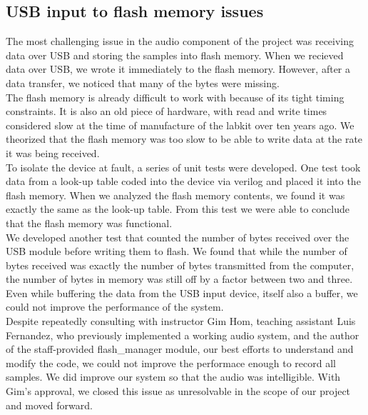 \documentclass{article}
\begin{document}
\subsection{USB input to flash memory issues}
The most challenging issue in the audio component of the project was receiving data over USB and storing the samples into flash memory. When we recieved data over USB, we wrote it immediately to the flash memory. However, after a data transfer, we noticed that many of the bytes were missing. \\
The flash memory is already difficult to work with because of its tight timing constraints. It is also an old piece of hardware, with read and write times considered slow at the time of manufacture of the labkit over ten years ago. We theorized that the flash memory was too slow to be able to write data at the rate it was being received. \\
To isolate the device at fault, a series of unit tests were developed. One test took data from a look-up table coded into the device via verilog and placed it into the flash memory. When we analyzed the flash memory contents, we found it was exactly the same as the look-up table. From this test we were able to conclude that the flash memory was functional. \\
We developed another test that counted the number of bytes received over the USB module before writing them to flash. We found that while the number of bytes received was exactly the number of bytes transmitted from the computer, the number of bytes in memory was still off by a factor between two and three. Even while buffering the data from the USB input device, itself also a buffer, we could not improve the performance of the system. \\
Despite repeatedly consulting with instructor Gim Hom, teaching assistant Luis Fernandez, who previously implemented a working audio system, and the author of the staff-provided flash\_manager module, our best efforts to understand and modify the code, we could not improve the performace enough to record all samples. We did improve our system so that the audio was intelligible. With Gim's approval, we closed this issue as unresolvable in the scope of our project and moved forward. 
\end{document}
